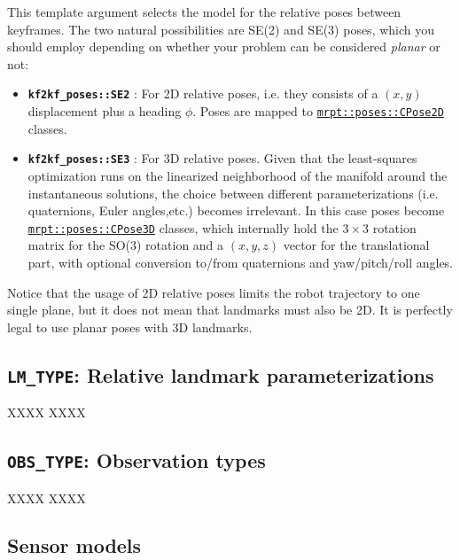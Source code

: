 \documentclass[a4paper,11pt]{article}
\begin{document}
This template argument selects the model for the relative poses between keyframes. 
The two natural possibilities are SE(2) and SE(3) poses, which you should employ 
depending on whether your problem can be considered \emph{planar} or not:

\begin{itemize}
\item{\textbf{ \texttt{kf2kf\_poses::SE2} }: For 2D relative poses, i.e. they consists of a $(x,y)$ displacement 
plus a heading $\phi$. Poses are mapped to 
\href{http://reference.mrpt.org/stable/classmrpt_1_1poses_1_1_c_pose2_d.html}
{\texttt{mrpt::poses::CPose2D}} classes. 
}
\item{\textbf{ \texttt{kf2kf\_poses::SE3} }: For 3D relative poses. Given that the least-squares optimization runs 
on the linearized neighborhood of the manifold \cite{blanco2010tutorial} around the instantaneous solutions, the 
choice between different parameterizations (i.e. quaternions, Euler angles,etc.) becomes irrelevant. 
In this case poses become 
\href{http://reference.mrpt.org/stable/classmrpt_1_1poses_1_1_c_pose3_d.html}
{\texttt{mrpt::poses::CPose3D}}
classes, which internally hold the $3 \times 3$ rotation matrix for the SO(3) rotation and a $(x,y,z)$ vector 
for the translational part, with optional conversion to/from quaternions and yaw/pitch/roll angles.
}
\end{itemize}

Notice that the usage of 2D relative poses limits the robot trajectory to one single plane, but 
it does not mean that landmarks must also be 2D. It is perfectly legal to use planar poses with 3D landmarks.


\subsection{\texttt{LM\_TYPE}: Relative landmark parameterizations}
\label{sec:k2f_types}

XXXX XXXX 

\subsection{\texttt{OBS\_TYPE}: Observation types}

XXXX XXXX 


\subsection{Sensor models}
\label{sect:program_sensors}
\end{document}
